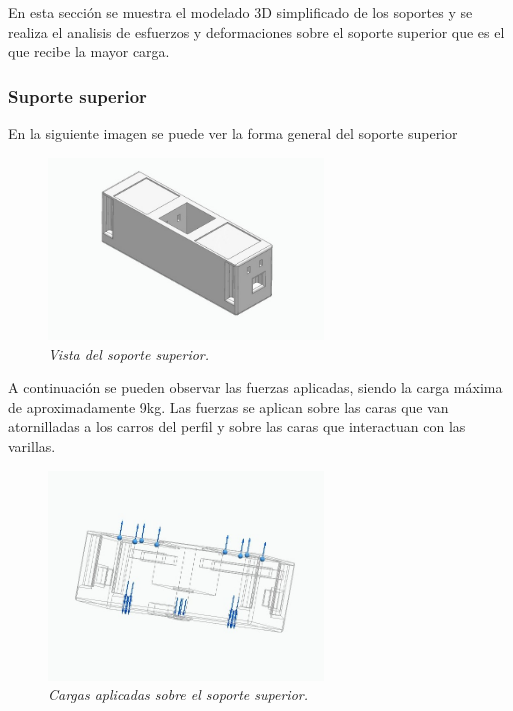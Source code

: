 En esta sección se muestra el modelado 3D simplificado de los soportes y se realiza el analisis de esfuerzos y deformaciones sobre el soporte superior que es el que recibe la mayor carga.
\subsubsection{Suporte superior}
En la siguiente imagen se puede ver la forma general del soporte superior
\begin{figure}[H]
    \centering
        \includegraphics[width=0.65\textwidth]{img/SuperiorReal_simplificado_vista.jpg}
        \caption{\textit{Vista del soporte superior.}}
        \label{fig:SuperiorReal_simplificado_vista}
\end{figure}
A continuación se pueden observar las fuerzas aplicadas, siendo la carga máxima de aproximadamente 9kg. Las fuerzas se aplican sobre las caras que van atornilladas a los carros del perfil y sobre las caras que interactuan con las varillas.
\begin{figure}[H]
    \centering
        \includegraphics[width=0.65\textwidth]{img/SuperiorReal_simplificado_fuerzas_app.jpg}
        \caption{\textit{Cargas aplicadas sobre el soporte superior.}}
        \label{fig:SuperiorReal_simplificado_fuerzas_app}
\end{figure}

